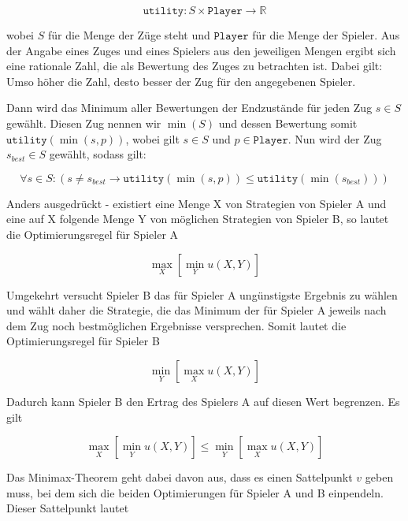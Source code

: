 \begin{equation}
\mathtt{utility}: S \times \mathtt{Player} \rightarrow \mathbb{R}
\end{equation}

wobei $S$ für die Menge der Züge steht und $\mathtt{Player}$ für die Menge der Spieler. Aus der Angabe eines Zuges und eines Spielers aus den jeweiligen Mengen ergibt sich eine rationale Zahl, die als Bewertung des Zuges zu betrachten ist. Dabei gilt: Umso höher die Zahl, desto besser der Zug für den angegebenen Spieler.

Dann wird das Minimum aller Bewertungen der Endzustände für jeden Zug $s \in S$ gewählt. Diesen Zug nennen wir $\min (S)$ und dessen Bewertung somit $\mathtt{utility}(\min (s, p))$, wobei gilt $s \in S$ und $p \in \mathtt{Player}$. Nun wird der Zug $s_{best} \in S$ gewählt, sodass gilt:

\begin{equation}
\forall s \in S : (s \neq s_{best} \rightarrow \mathtt{utility}(\min(s, p)) \leq \mathtt{utility}(\min(s_{best})))
\end{equation}

Anders ausgedrückt - existiert eine Menge X von Strategien von Spieler A und eine auf X folgende Menge Y von möglichen Strategien von Spieler B, so lautet die Optimierungsregel für Spieler A

\begin{equation}
\max\limits_X[\min\limits_Yu(X,Y)]
\end{equation}

Umgekehrt versucht Spieler B das für Spieler A ungünstigste Ergebnis zu wählen und wählt daher die Strategie, die das Minimum der für Spieler A jeweils nach dem Zug noch bestmöglichen Ergebnisse versprechen. Somit lautet die Optimierungsregel für Spieler B

\begin{equation}
\min\limits_Y[\max\limits_Xu(X,Y)]
\end{equation}


Dadurch kann Spieler B den Ertrag des Spielers A auf diesen Wert begrenzen. Es gilt

\begin{equation}
\max\limits_X[\min\limits_Yu(X,Y)] \leq \min\limits_Y[\max\limits_Xu(X,Y)]
\end{equation}

Das Minimax-Theorem geht dabei davon aus, dass es einen Sattelpunkt $v$ geben muss, bei dem sich die beiden Optimierungen für Spieler A und B einpendeln. Dieser Sattelpunkt lautet

